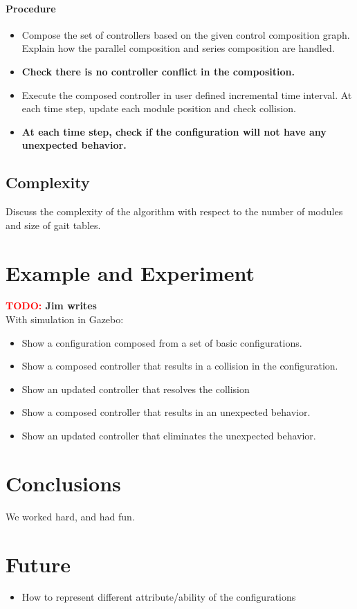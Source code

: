 \documentclass[conference]{IEEEtran}
\theoremstyle{definition}
\newcommand{\TODO}[1]{ {\bf \textcolor{red}{TODO:} #1 }}
\begin{document}
\paragraph{Procedure}
\begin{itemize}
\item Compose the set of controllers based on the given control composition graph. Explain how the parallel composition and series composition are handled.
\item\textbf{Check there is no controller conflict in the composition.}
\item Execute the composed controller in user defined incremental time interval. At each time step, update each module position and check collision.
\item \textbf{At each time step, check if the configuration will not have any unexpected behavior.}
\end{itemize}

\subsection{Complexity}
Discuss the complexity of the algorithm with respect to the number of modules and size of gait tables.

\section{Example and Experiment}
\label{sec:example}
\TODO{Jim writes}\\
With simulation in Gazebo:
\begin{itemize}
\item Show a configuration composed from a set of basic configurations.
\item Show a composed controller that results in a collision in the configuration.
\item Show an updated controller that resolves the collision
\item Show a composed controller that results in an unexpected behavior.
\item Show an updated controller that eliminates the unexpected behavior.
\end{itemize}

\section{Conclusions}
We worked hard, and had fun.

\section{Future}
\begin{itemize}
\item How to represent different attribute/ability of the configurations
\end{itemize}







\end{document}
